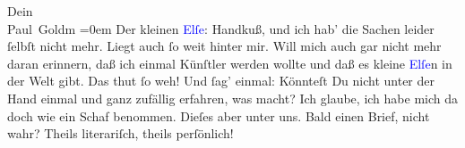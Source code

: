            \pstart
           Dein {\\[\baselineskip]}\spacefill\mbox{Paul Goldm}\pend
           \leftskip=0em{}\pstart
           \noindent{}Der kleinen \textcolor{blue}{Elſe}{}\ledrightnote{\textcolor{blue}{Else Singer}}: Handkuß, und ich hab’ die
                  Sachen leider ſelbſt nicht mehr. Liegt auch ſo weit hinter mir. Will mich auch gar
                  nicht mehr daran erinnern, daß ich einmal Künſtler werden wollte und daß es kleine
                     \textcolor{blue}{Elſe}{}\ledrightnote{\textcolor{blue}{Else Singer}}n in der {\pb}Welt gibt. Das thut ſo weh!\pend
           \pstart
           Und ſag’ einmal: Könnteſt Du nicht unter der Hand einmal und ganz zufällig
                  erfahren, was \label{K_L02704-15v}\label{K_L02704-15h} macht? Ich glaube, ich habe mich da doch wie ein Schaf benommen. Dieſes
                  aber unter uns.\pend
           \pstart
           Bald einen Brief, nicht wahr? Theils literariſch, theils perſönlich!\pend
           \endnumbering{}\begin{anhang}\end{anhang}
      